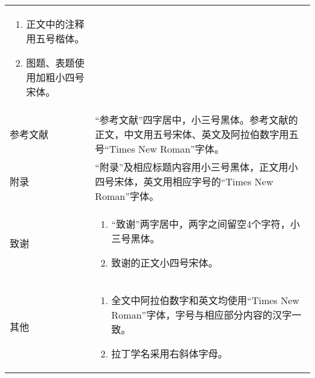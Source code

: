 \begin{center}
\begin{longtable}{m{5cm}m{9cm}}
\begin{enumerate}
      \item 正文中的注释用五号楷体。
      \item 图题、表题使用加粗小四号宋体。
    \end{enumerate}\\
    参考文献 & “参考文献”四字居中，小三号黑体。参考文献的正文，中文用五号宋体、英文及阿拉伯数字用五号“Times New Roman”字体。\\
    附录 & “附录”及相应标题内容用小三号黑体，正文用小四号宋体，英文用相应字号的“Times New Roman”字体。\\
    致谢 & 
    \begin{enumerate}
      \item “致谢”两字居中，两字之间留空4个字符，小三号黑体。        
      \item 致谢的正文小四号宋体。       
    \end{enumerate}\\
    其他 & 
    \begin{enumerate}
      \item 全文中阿拉伯数字和英文均使用“Times New Roman”字体，字号与相应部分内容的汉字一致。
      \item 拉丁学名采用右斜体字母。
    \end{enumerate}\\
  \end{longtable}
\end{center}